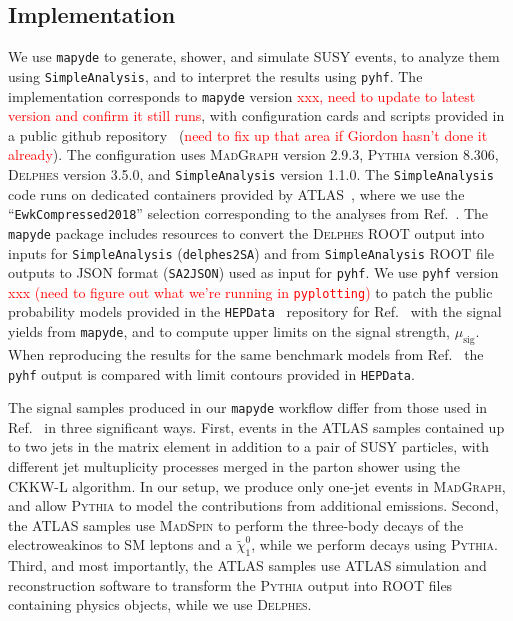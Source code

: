 \documentclass{article}
\newcommand{\chioz}{\ensuremath{\widetilde{\chi}_{1}^{0}}}
\newcommand{\mapyde}{\texttt{mapyde}}
\newcommand{\simpleanalysis}{\texttt{SimpleAnalysis}}
\newcommand{\madgraph}{\textsc{MadGraph}}
\newcommand{\madspin}{\textsc{MadSpin}}
\newcommand{\pythia}{\textsc{Pythia}}
\newcommand{\delphes}{\textsc{Delphes}}
\newcommand{\pyhf}{\texttt{pyhf}}
\newcommand{\musig}{\ensuremath{\mu_{\mathrm{sig}}}}
\newcommand{\hepdata}{\texttt{HEPData}}
\begin{document}
\subsection{Implementation}
\label{ssec:implementation}

We use \mapyde{} to generate, shower, and simulate SUSY events, to analyze them using \simpleanalysis, and to interpret the results using \pyhf.  The implementation corresponds to \mapyde{} version \textcolor{red}{xxx, need to update to latest version and confirm it still runs}, with configuration cards and scripts provided in a public github repository~\cite{mapyde-user} (\textcolor{red}{need to fix up that area if Giordon hasn't done it already}).  The configuration uses \madgraph{} version 2.9.3, \pythia{} version 8.306, \delphes{} version 3.5.0, and \simpleanalysis{} version 1.1.0.  The \simpleanalysis{} code runs on dedicated containers provided by ATLAS~\cite{SAGitLabRegistry}, where we use the \enquote{\texttt{EwkCompressed2018}} selection corresponding to the analyses from Ref.~\cite{ATLAS:2019lng}.  The \mapyde{} package includes resources to convert the \delphes{} ROOT output into inputs for \simpleanalysis{} (\texttt{delphes2SA}) and from \simpleanalysis{} ROOT file outputs to JSON format (\texttt{SA2JSON}) used as input for \pyhf.  We use \pyhf{} version \textcolor{red}{xxx (need to figure out what we're running in \texttt{pyplotting})} to patch the public probability models provided in the \hepdata~\cite{HepData} repository for Ref.~\cite{ATLAS:2019lng} with the signal yields from \mapyde, and to compute upper limits on the signal strength, \musig.  When reproducing the results for the same benchmark models from Ref.~\cite{ATLAS:2019lng} the \pyhf{} output is compared with limit contours provided in \hepdata.

The signal samples produced in our \mapyde{} workflow differ from those used in Ref.~\cite{ATLAS:2019lng} in three significant ways.  First, events in the ATLAS samples contained up to two jets in the matrix element in addition to a pair of SUSY particles, with different jet multuplicity processes merged in the parton shower using the CKKW-L algorithm.  In our setup, we produce only one-jet events in \madgraph, and allow \pythia{} to model the contributions from additional emissions.  Second, the ATLAS samples use \madspin{} to perform the three-body decays of the electroweakinos to SM leptons and a \chioz, while we perform decays using \pythia.  Third, and most importantly, the ATLAS samples use ATLAS simulation and reconstruction software to transform the \pythia{} output into ROOT files containing physics objects, while we use \delphes.
\end{document}
